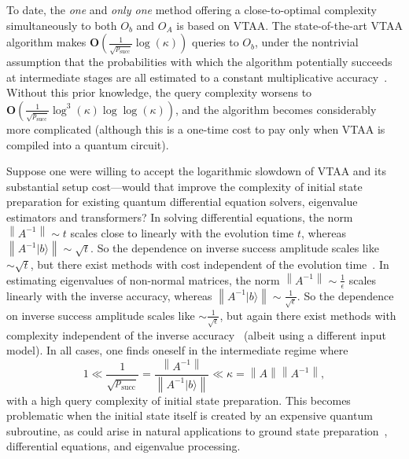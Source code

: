 \documentclass[letterpaper,onecolumn,11pt,accepted=2026-02-14]{quantumarticle}
\newcommand{\norm}[1]{\left\lVert#1\right\rVert}
\theoremstyle{remark}
\theoremstyle{plain}
\newcommand{\ket}[1]{|#1\rangle}
\begin{document}
To date, the \emph{one} and \emph{only one} method offering a close-to-optimal complexity simultaneously to both $O_b$ and $O_A$ is based on VTAA. The state-of-the-art VTAA algorithm makes $\mathbf{O}\left(\frac{1}{\sqrt{p_{\text{succ}}}}\log(\kappa)\right)$ queries to $O_b$, under the nontrivial assumption that the probabilities with which the algorithm potentially succeeds at intermediate stages are all estimated to a constant multiplicative accuracy~\cite{Chakraborty2018BlockEncoding}. Without this prior knowledge, the query complexity worsens to $\mathbf{O}\left(\frac{1}{\sqrt{p_{\text{succ}}}}\log^3(\kappa)\log\log(\kappa)\right)$, and the algorithm becomes considerably more complicated (although this is a one-time cost to pay only when VTAA is compiled into a quantum circuit).

Suppose one were willing to accept the logarithmic slowdown of VTAA and its substantial setup cost---would that improve the complexity of initial state preparation for existing quantum differential equation solvers, eigenvalue estimators and transformers? In solving differential equations, the norm $\norm{A^{-1}}\sim t$ scales close to linearly with the evolution time $t$, whereas $\norm{A^{-1}\ket{b}}\sim\sqrt{t}$. So the dependence on inverse success amplitude scales like $\sim\sqrt{t}$, but there exist methods with cost independent of the evolution time~\cite{Fang2023timemarchingbased,AnChildsLin23}. In estimating eigenvalues of non-normal matrices, the norm $\norm{A^{-1}}\sim \frac{1}{\epsilon}$ scales linearly with the inverse accuracy, whereas $\norm{A^{-1}\ket{b}}\sim\frac{1}{\sqrt{\epsilon}}$. So the dependence on inverse success amplitude scales like $\sim\frac{1}{\sqrt{\epsilon}}$, but again there exist methods with complexity independent of the inverse accuracy~\cite{Zhang2024Nonnormal} (albeit using a different input model). In all cases, one finds oneself in the intermediate regime where
\begin{equation}
    1\ll \frac{1}{\sqrt{p_{\text{succ}}}}=\frac{\norm{A^{-1}}}{\norm{A^{-1}\ket{b}}}
    \ll \kappa=\norm{A}\norm{A^{-1}},
\end{equation}
with a high query complexity of initial state preparation. This becomes problematic when the initial state itself is created by an expensive quantum subroutine, as could arise in natural applications to ground state preparation~\cite{berry2024rapid}, differential equations, and eigenvalue processing.
\end{document}
